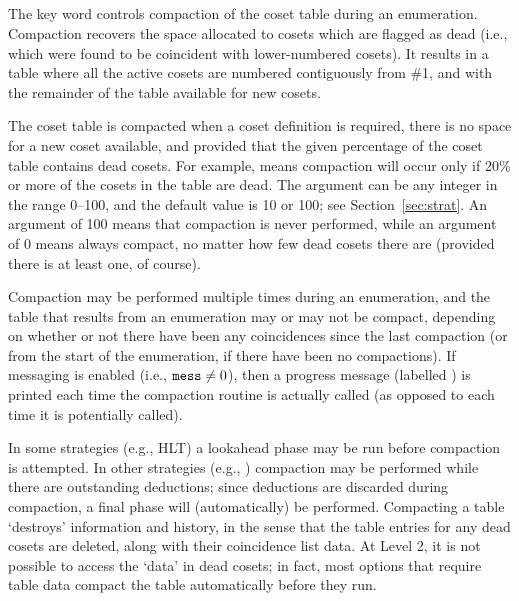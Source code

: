 \subsection{}

The key word  controls compaction of the coset table during an
  enumeration.
Compaction recovers the space allocated to cosets which are flagged as 
  dead (i.e., which were found to be coincident with lower-numbered
  cosets). 
It results in a table where all the active cosets are numbered contiguously
  from \#1, and with the remainder of the table available for new cosets.

The coset table is compacted when a coset definition is required, there is
  no space for a new coset available, and provided that the given 
  percentage of the coset table contains dead cosets.
For example,  means compaction will occur only if 20\% or more
  of the cosets in the table are dead.
The argument can be any integer in the range 0--100, and the default value
  is 10 or 100; see Section~\ref{sec:strat}.
An argument of 100 means that compaction is never performed, while an
  argument of 0 means always compact, no matter how few dead cosets there
  are (provided there is at least one, of course).

Compaction may be performed multiple times during an enumeration, and the
  table that results from an enumeration may or may not be compact,
  depending on whether or not there have been any coincidences since the
  last compaction (or from the start of the enumeration, if there have been
  no compactions).
If messaging is enabled (i.e., $\texttt{mess} \ne 0$), then a progress
  message (labelled ) is printed each time the compaction routine
  is actually called (as opposed to each time it is potentially called).

In some strategies (e.g., HLT) a lookahead phase may be run before
  compaction is attempted.
In other strategies (e.g., ) compaction may be performed while
  there are outstanding deductions; since deductions are discarded during
  compaction, a final  phase will (automatically) be performed.
%
Compacting a table `destroys' information and history, in the sense that
  the table entries for any dead cosets are deleted, along with their
  coincidence list data.
At Level 2, it is not possible to access the `data' in dead cosets; in
  fact, most options that require table data compact the table 
  automatically before they run.

